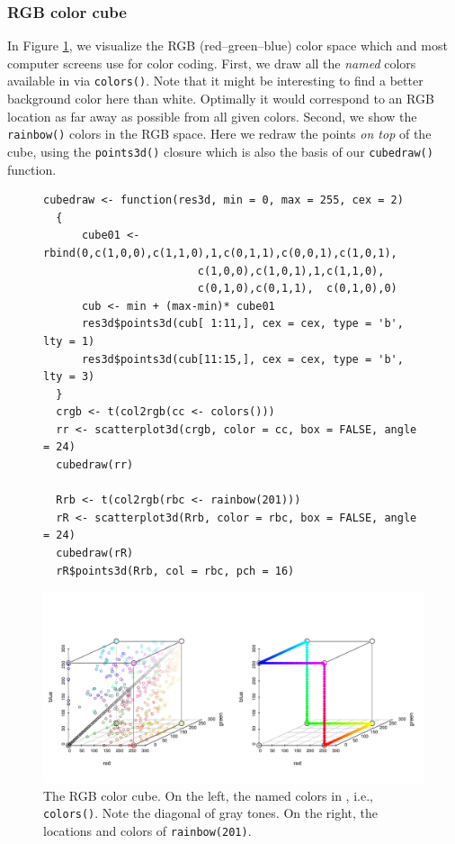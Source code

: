 \subsubsection{RGB color cube}
In Figure \ref{colorcube}, we visualize the RGB (red--green--blue) color
space which \RR{} and most computer screens use for color coding.
First, we draw all the \emph{named} colors available in \RR{} via
\texttt{colors()}.  Note that it might be interesting to find a better
background color here than white. Optimally it would correspond to an RGB
location as far away as possible from all given colors.
Second, we show the \texttt{rainbow()} colors in the RGB space.  Here we
redraw the points \emph{on top} of the cube, using the \texttt{points3d()}
closure which is also the basis of our \texttt{cubedraw()} function.
\begin{figure}[htb!]
\small


\begin{Verbatim}[frame=single]
  cubedraw <- function(res3d, min = 0, max = 255, cex = 2)
  {
      cube01 <- rbind(0,c(1,0,0),c(1,1,0),1,c(0,1,1),c(0,0,1),c(1,0,1),
                        c(1,0,0),c(1,0,1),1,c(1,1,0),
                        c(0,1,0),c(0,1,1),  c(0,1,0),0)
      cub <- min + (max-min)* cube01
      res3d$points3d(cub[ 1:11,], cex = cex, type = 'b', lty = 1)
      res3d$points3d(cub[11:15,], cex = cex, type = 'b', lty = 3)
  }
  crgb <- t(col2rgb(cc <- colors()))
  rr <- scatterplot3d(crgb, color = cc, box = FALSE, angle = 24)
  cubedraw(rr)

  Rrb <- t(col2rgb(rbc <- rainbow(201)))
  rR <- scatterplot3d(Rrb, color = rbc, box = FALSE, angle = 24)
  cubedraw(rR)
  rR$points3d(Rrb, col = rbc, pch = 16)
\end{Verbatim}
\par\vspace*{-12mm}%
\normalsize
\centerline{\includegraphics[width=19cm]{colorcube}}
\par\vspace*{-5mm}
\caption{The RGB color cube. On the left, the named colors in \RR{}, i.e.,
  \texttt{colors()}. Note the diagonal of gray tones. On the right, the
  locations and colors of \texttt{rainbow(201)}.\label{colorcube}}
\end{figure}





